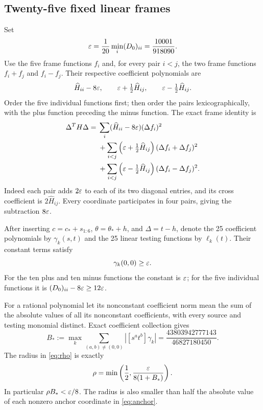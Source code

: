 \subsection{Twenty-five fixed linear frames}

Set
\begin{equation}
 \varepsilon=\frac1{20}\min_i(D_0)_{ii}=\frac{10001}{918090}.
 \label{eq:eps}
\end{equation}
Use the five frame functions $f_i$ and, for every pair $i<j$, the two frame
functions $f_i+f_j$ and $f_i-f_j$. Their respective coefficient polynomials
are
\begin{equation}
 \widehat H_{ii}-8\varepsilon,\qquad
 \varepsilon+\tfrac12\widehat H_{ij},\qquad
 \varepsilon-\tfrac12\widehat H_{ij}.
 \label{eq:coefficients}
\end{equation}
Order the five individual functions first; then order the pairs
lexicographically, with the plus function preceding the minus function.
The exact frame identity is
\begin{align}
 \Delta^TH\Delta={}&
 \sum_i(\widehat H_{ii}-8\varepsilon)(\Delta f_i)^2\notag\\
 &+\sum_{i<j}\left(\varepsilon+\tfrac12\widehat H_{ij}\right)
                   (\Delta f_i+\Delta f_j)^2\notag\\
 &+\sum_{i<j}\left(\varepsilon-\tfrac12\widehat H_{ij}\right)
                   (\Delta f_i-\Delta f_j)^2.
 \label{eq:frame}
\end{align}
Indeed each pair adds $2\varepsilon$ to each of its two diagonal entries, and its
cross coefficient is $2\widehat H_{ij}$. Every coordinate participates in
four pairs, giving the subtraction $8\varepsilon$.

After inserting $c=c_*+s_{1:6}$, $\theta=\theta_*+h$, and $\Delta=t-h$, denote
the 25 coefficient polynomials by $\gamma_k(s,t)$ and the 25 linear testing
functions by $\ell_k(t)$. Their constant terms satisfy
\begin{equation}
 \gamma_k(0,0)\geq\varepsilon.
 \label{eq:constantpositive}
\end{equation}
For the ten plus and ten minus functions the constant is $\varepsilon$; for the
five individual functions it is $(D_0)_{ii}-8\varepsilon\geq12\varepsilon$.

For a rational polynomial let its nonconstant coefficient norm mean the sum
of the absolute values of all its nonconstant coefficients, with every
source and testing monomial distinct. Exact coefficient collection gives
\begin{equation}
 B_*:=\max_k\sum_{(a,b)\ne(0,0)}|[s^at^b]\gamma_k|
   =\frac{43803942777143}{46827180450}.
 \label{eq:B}
\end{equation}
The radius in \eqref{eq:rho} is exactly
\begin{equation}
 \rho=\min\left(\frac12,\frac{\varepsilon}{8(1+B_*)}\right).
 \label{eq:radiusformula}
\end{equation}
In particular $\rho B_*<\varepsilon/8$. The radius is also smaller than half the
absolute value of each nonzero anchor coordinate in \eqref{eq:anchor}.

